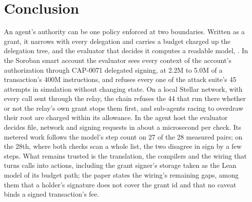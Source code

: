 \section{Conclusion}\label{sec:conclusion}

An agent's authority can be one policy enforced at two boundaries. Written as
a grant, it narrows with every delegation and carries a budget charged up the
delegation tree, and the evaluator that decides it computes a readable model,
\translationtrust. In the Soroban smart account the evaluator sees every
context of the account's authorization through CAP-0071 delegated signing, at
2.2M to 5.0M of a transaction's 400M instructions, and refuses every one of
the attack suite's 45 attempts in simulation without changing state. On a
local Stellar network, with every call sent through the relay, the chain
refuses the 44 that run there whether or not the relay's own grant stops them
first, and sub-agents racing to overdraw their root are charged within its
allowance. In the agent host the evaluator decides file, network and signing
requests in about a microsecond per check. Its metered work follows the
model's step count on 27 of the 28 measured pairs; on the 28th, where both
checks scan a whole list, the two disagree in sign by a few steps. What remains trusted is the translation, the compilers and the wiring that
turns calls into actions, including the grant signer's storage taken as the
Lean model of its budget path; the paper states the wiring's remaining gaps,
among them that a holder's signature does not cover the grant id and that no
caveat binds a signed transaction's fee.
